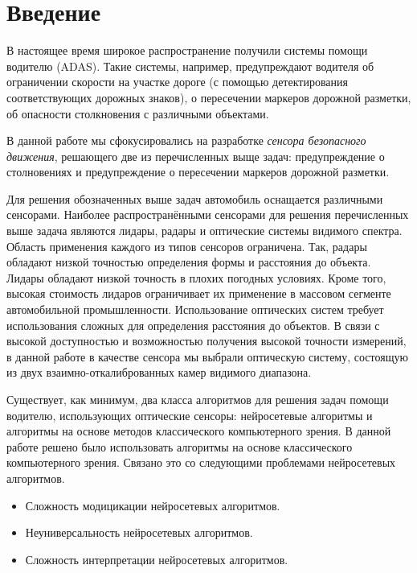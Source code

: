 \documentclass[aps,%
14pt,%
final,%
oneside,
onecolumn,%
musixtex, %
superscriptaddress,%
centertags]{extarticle} %
\begin{document}
\tableofcontents

\section*{Введение}




В настоящее время широкое распространение получили системы помощи водителю (ADAS). Такие системы, например, предупреждают водителя об ограничении скорости на участке дороге (с помощью детектирования соответствующих дорожных знаков), о пересечении маркеров дорожной разметки, об опасности столкновения с различными объектами.

В данной работе мы сфокусировались на разработке \textit{сенсора безопасного движения}, решающего две из перечисленных выще задач: предупреждение о столновениях и предупреждение о пересечении маркеров дорожной разметки. 

Для решения обозначенных выше задач автомобиль оснащается различными сенсорами. Наиболее распространёнными сенсорами для решения перечисленных выше задача являются лидары, радары и оптические системы видимого спектра. Область применения каждого из типов сенсоров ограничена. Так, радары обладают низкой точностью определения формы и расстояния до объекта. Лидары обладают низкой точность в плохих погодных условиях. Кроме того, высокая стоимость лидаров ограничивает их применение в массовом сегменте автомобильной промышленности. Использование оптических систем требует использования сложных для определения расстояния до объектов. В связи с высокой доступностью и возможностью получения высокой точности измерений, в данной работе в качестве сенсора мы выбрали оптическую систему, состоящую из двух взаимно-откалиброванных камер видимого диапазона.

Существует, как минимум, два класса алгоритмов для решения задач помощи водителю, использующих оптические сенсоры: нейросетевые алгоритмы и алгоритмы на основе методов классического компьютерного зрения. В данной работе решено было использовать алгоритмы на основе классического компьютерного зрения. Связано это со следующими проблемами нейросетевых алгоритмов.
\begin{itemize}
\item Сложность модицикации нейросетевых алгоритмов.
\item Неуниверсальность нейросетевых алгоритмов.
\item Сложность интерпретации нейросетевых алгоритмов.
\end{itemize}
\end{document}
